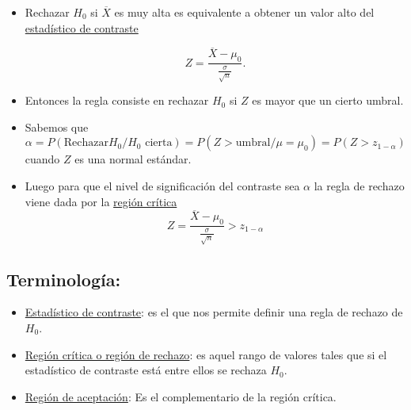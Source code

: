 \begin{frame}
\begin{itemize}
\item  Rechazar $H_{0}$ si $\overline{X}$ es muy alta es equivalente
    a obtener un valor alto del \underline{estadístico de contraste}

    $$Z=\frac{\overline{X}-\mu_{0}}{\frac{\sigma}{\sqrt{n}}}.$$
\item Entonces  la regla consiste en rechazar $H_{0}$ si $Z$ es mayor que un
    cierto umbral.
\item Sabemos que $\alpha=P(\mbox{Rechazar} H_{0}/ H_{0} \mbox{ cierta})=P(Z>\mbox{umbral}/\mu=\mu_{0})= P(Z>z_{1-\alpha})$
    cuando $Z$ es una normal estándar.
\item Luego para que el nivel de significación del contraste sea $\alpha$ la regla de rechazo viene dada por la \underline{región crítica}
     $$Z=\frac{\overline{X}-\mu_{0}}{\frac{\sigma}{\sqrt{n}}}>z_{1-\alpha}$$
\end{itemize}
\end{frame}

\begin{frame}
\section{Terminología:} 
\begin{itemize}
\item \underline{Estadístico de contraste}: es el
que nos permite definir una regla de rechazo de $H_{0}$. 
\item \underline{Región crítica o región
de rechazo}:
es aquel rango de valores tales que si el estadístico de contraste
está entre ellos se rechaza $H_{0}$.
\item \underline{Región de aceptación}: Es el complementario de la región
  crítica.
  \end{itemize}

\end{frame}

